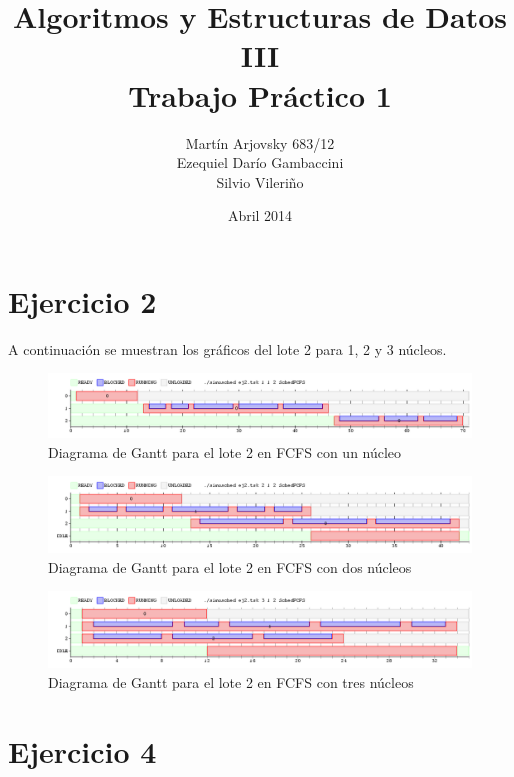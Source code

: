 \documentclass{article}
\title{Algoritmos y Estructuras de Datos III \\ Trabajo Pr\'{a}ctico 1}
\author{Mart\'{i}n Arjovsky 683/12\\ Ezequiel Dar\'io Gambaccini \\ Silvio Vileri\~no}
\date{Abril 2014}
\begin{document}
 \maketitle
  
  \section{Ejercicio 2}
  
  A continuaci\'on se muestran los gr\'aficos del lote 2 para 1, 2 y 3 n\'ucleos.
  \begin{figure}[htb]
  \includegraphics[scale=0.32]{ej2_1.png}
  \caption{Diagrama de Gantt para el lote 2 en FCFS con un n\'ucleo}
  \end{figure}
  \begin{figure}[htb]
  \includegraphics[scale=0.32]{ej2_2.png}
  \caption{Diagrama de Gantt para el lote 2 en FCFS con dos n\'ucleos}
  \end{figure}
  \begin{figure}[htb]
  \includegraphics[scale=0.32]{ej2_3.png}
  \caption{Diagrama de Gantt para el lote 2 en FCFS con tres n\'ucleos}
  \end{figure}
 
  \section{Ejercicio 4}
  
\end{document}
